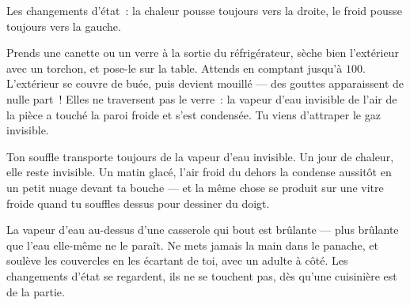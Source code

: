 \begin{omfigure}

{\small Les changements d'état~: la chaleur pousse toujours vers la
droite, le froid pousse toujours vers la gauche.}
\end{omfigure}

\begin{example}\label{ex:g2:ice-water-steam:catch}
Prends une canette ou un verre à la sortie du réfrigérateur, sèche
bien l'extérieur avec un torchon, et pose-le sur la table. Attends en
comptant jusqu'à $100$. L'extérieur se couvre de buée, puis devient
mouillé --- des gouttes apparaissent de nulle part~! Elles ne
traversent pas le verre~: la vapeur d'eau invisible de l'air de la
pièce a touché la paroi froide et s'est condensée. Tu viens
d'attraper le gaz invisible.
\end{example}

\begin{example}\label{ex:g2:ice-water-steam:breath}
Ton souffle transporte toujours de la vapeur d'eau invisible. Un jour
de chaleur, elle reste invisible. Un matin glacé, l'air froid du
dehors la condense aussitôt en un petit nuage devant ta bouche ---
et la même chose se produit sur une vitre froide quand tu souffles
dessus pour dessiner du doigt.
\end{example}

\begin{remark}\label{rem:g2:ice-water-steam:safety}
La vapeur d'eau au-dessus d'une casserole qui bout est brûlante ---
plus brûlante que l'eau elle-même ne le paraît. Ne mets jamais la
main dans le panache, et soulève les couvercles en les écartant de
toi, avec un adulte à côté. Les changements d'état se regardent, ils
ne se touchent pas, dès qu'une cuisinière est de la partie.
\end{remark}

